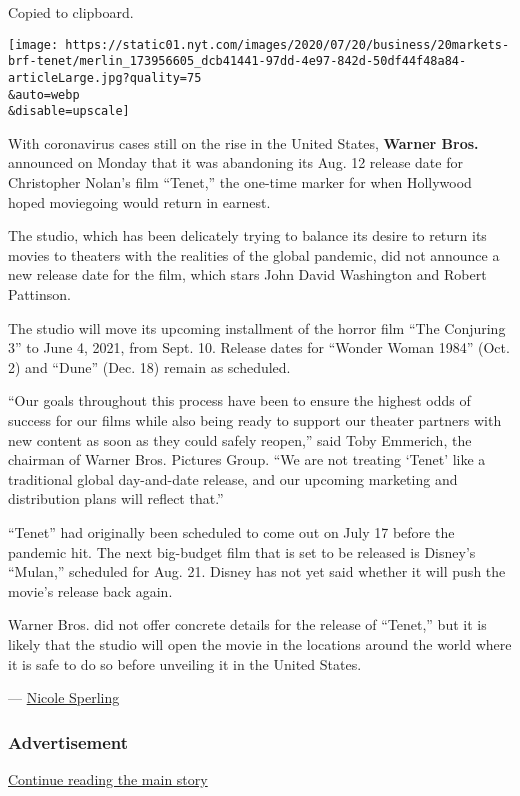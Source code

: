 Copied to clipboard.

\texttt{[image: https://static01.nyt.com/images/2020/07/20/business/20markets-brf-tenet/merlin\_173956605\_dcb41441-97dd-4e97-842d-50df44f48a84-articleLarge.jpg?quality=75\\\&auto=webp\\\&disable=upscale]}

With coronavirus cases still on the rise in the United States,
\textbf{Warner Bros.} announced on Monday that it was abandoning its
Aug. 12 release date for Christopher Nolan's film ``Tenet,'' the
one-time marker for when Hollywood hoped moviegoing would return in
earnest.

The studio, which has been delicately trying to balance its desire to
return its movies to theaters with the realities of the global pandemic,
did not announce a new release date for the film, which stars John David
Washington and Robert Pattinson.

The studio will move its upcoming installment of the horror film ``The
Conjuring 3'' to June 4, 2021, from Sept. 10. Release dates for ``Wonder
Woman 1984'' (Oct. 2) and ``Dune'' (Dec. 18) remain as scheduled.

``Our goals throughout this process have been to ensure the highest odds
of success for our films while also being ready to support our theater
partners with new content as soon as they could safely reopen,'' said
Toby Emmerich, the chairman of Warner Bros. Pictures Group. ``We are not
treating `Tenet' like a traditional global day-and-date release, and our
upcoming marketing and distribution plans will reflect that.''

``Tenet'' had originally been scheduled to come out on July 17 before
the pandemic hit. The next big-budget film that is set to be released is
Disney's ``Mulan,'' scheduled for Aug. 21. Disney has not yet said
whether it will push the movie's release back again.

Warner Bros. did not offer concrete details for the release of
``Tenet,'' but it is likely that the studio will open the movie in the
locations around the world where it is safe to do so before unveiling it
in the United States.

--- \href{https://www.nytimes.com/by/nicole-sperling}{Nicole Sperling}

\hypertarget{advertisement-2}{%
\subsubsection{Advertisement}\label{advertisement-2}}

\protect\hyperlink{after-dfp-ad-mid3}{Continue reading the main story}

